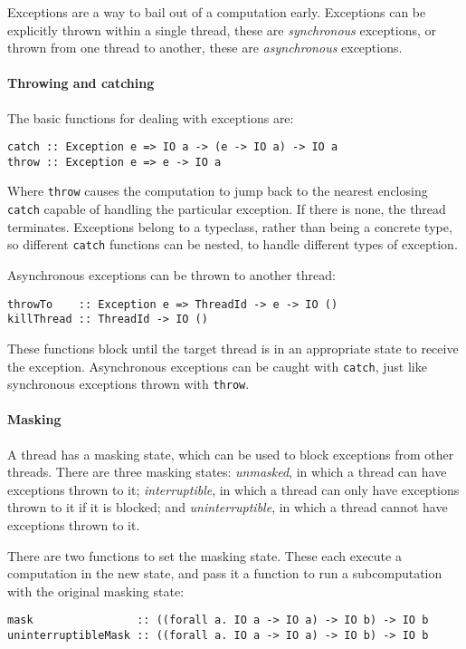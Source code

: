 Exceptions are a way to bail out of a computation early.  Exceptions can be
explicitly thrown within a single thread, these are \emph{synchronous}
exceptions, or thrown from one thread to another, these are \emph{asynchronous}
exceptions.

\paragraph{Throwing and catching}
The basic functions for dealing with exceptions are:

\begin{verbatim}
catch :: Exception e => IO a -> (e -> IO a) -> IO a
throw :: Exception e => e -> IO a
\end{verbatim}

Where \verb|throw| causes the computation to jump back to the nearest
enclosing \verb|catch| capable of handling the particular exception.
If there is none, the thread terminates.  Exceptions belong to a
typeclass, rather than being a concrete type, so different
\verb|catch| functions can be nested, to handle different types of
exception.

Asynchronous exceptions can be thrown to another thread:

\begin{verbatim}
throwTo    :: Exception e => ThreadId -> e -> IO ()
killThread :: ThreadId -> IO ()
\end{verbatim}

These functions block until the target thread is in an appropriate state to
receive the exception.  Asynchronous exceptions can be caught with \verb|catch|,
just like synchronous exceptions thrown with \verb|throw|.

\paragraph{Masking}
A thread has a masking state, which can be used to block exceptions
from other threads.  There are three masking states: \emph{unmasked},
in which a thread can have exceptions thrown to it;
\emph{interruptible}, in which a thread can only have exceptions
thrown to it if it is blocked; and \emph{uninterruptible}, in which a
thread cannot have exceptions thrown to it.

There are two functions to set the masking state.  These each execute a
computation in the new state, and pass it a function to run a subcomputation
with the original masking state:

\begin{verbatim}
mask                :: ((forall a. IO a -> IO a) -> IO b) -> IO b
uninterruptibleMask :: ((forall a. IO a -> IO a) -> IO b) -> IO b
\end{verbatim}

